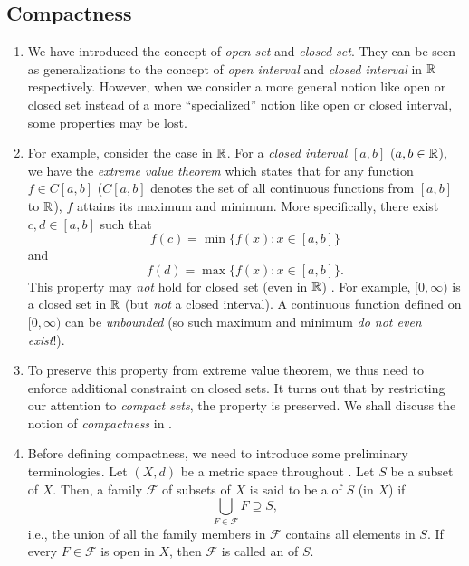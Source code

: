 \subsection{Compactness}
\label{subsect:compactness}
\begin{enumerate}
\item We have introduced the concept of \emph{open set} and \emph{closed set}.
They can be seen as generalizations to the concept of \emph{open interval} and
\emph{closed interval} in \(\mathbb{R}\) respectively. However, when we consider a more
general notion like open or closed set instead of a more ``specialized'' notion
like open or closed interval, some properties may be lost.

\item For example, consider the case in \(\mathbb{R}\). For a \emph{closed interval}
\([a,b]\) (\(a,b\in\mathbb{R}\)), we have the \emph{extreme value theorem} which states
that for any function \(f\in C[a,b]\) (\(C[a,b]\) denotes the set of all
continuous functions from \([a,b]\) to \(\mathbb{R}\)), \(f\) attains its maximum and
minimum. More specifically, there exist \(c,d\in[a,b]\) such that
\[
f(c)=\min\{f(x):x\in [a,b]\}
\]
and
\[
f(d)=\max\{f(x):x\in[a,b]\}.
\]
This property may \emph{not} hold for closed set (even in \(\mathbb{R}\)) \warn{}. For
example, \([0,\infty)\) is a closed set in \(\mathbb{R}\) (but \emph{not} a closed
interval). A continuous function defined on \([0,\infty)\) can be
\emph{unbounded} (so such maximum and minimum \emph{do not even exist}!).

\item To preserve this property from extreme value theorem, we thus need to
enforce additional constraint on closed sets. It turns out that by restricting
our attention to \emph{compact sets}, the property is preserved.  We shall
discuss the notion of \emph{compactness} in .

\item Before defining compactness, we need to introduce some preliminary
terminologies. Let \((X,d)\) be a metric space throughout
. Let \(S\) be a subset of \(X\). Then, a family
\(\mathcal{F}\) of subsets of \(X\) is said to be a  of \(S\) (in
\(X\)) if
\[
\bigcup_{F\in\mathcal{F}}F\supseteq S,
\]
i.e., the union of all the family members in \(\mathcal{F}\) contains all
elements in \(S\). If every \(F\in\mathcal{F}\) is open in \(X\), then
\(\mathcal{F}\) is called an  of \(S\).


\end{enumerate}
